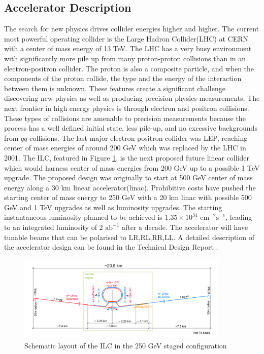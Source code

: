 \subsection{Accelerator Description}
\label{ilc}


The search for new physics drives collider energies higher and higher. The current most powerful operating collider is the Large Hadron Collider(LHC) at CERN with a center of mass energy of 13 TeV. The LHC has a very busy environment with significantly more pile up from many proton-proton collisions than in an electron-positron collider. The proton is also a composite particle, and when the components of the proton collide, the type and the energy of the interaction between them is unknown. These features create a significant challenge discovering new physics as well as producing precision physics measurements. The next frontier in high energy physics is through electron and positron collisions. These types of collisions are amenable to precision measurements because the process has a well defined initial state, less pile-up, and no excessive backgrounds from $qq$ collisions. The last major electron-positron collider was LEP, reaching center of mass energies of around 200 GeV which was replaced by the LHC in 2001.  The ILC, featured in Figure \ref{fig:ilc}, is the next proposed future linear collider which would harness center of mass energies from 200 GeV up to a possible 1 TeV upgrade.  The proposed design was originally to start at 500 GeV center of mass energy along a 30 km linear accelerator(linac). Prohibitive costs have pushed the starting center of mass energy to 250 GeV  with a 20 km linac with possible 500 GeV and 1 TeV upgrades as well as luminosity upgrades.  The starting instantaneous luminosity planned to be achieved is $1.35 \times 10^{34} \, \, \text{cm}^{−2}\text{s}^{−1}$, leading to an integrated luminosity of $2 \, \, \text{ab}^{-1}$ after a decade. The accelerator will have tunable beams that can be polarised to LR,RL,RR,LL.\cite{currdetector} A detailed description of the accelerator design can be found in the Technical Design Report \cite{tdraccel}.

\begin{figure}

\includegraphics[width=0.9\textwidth]{ilc.pdf}
\caption{Schematic layout of the ILC in the 250 GeV staged configuration \cite{currdetector} }
\label{fig:ilc}
\end{figure}

